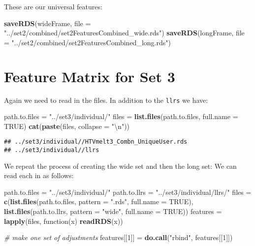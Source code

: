 \documentclass[10pt]{report}
\newenvironment{Shaded}{}{}
\newcommand{\KeywordTok}[1]{\textcolor[rgb]{0.00,0.44,0.13}{\textbf{{#1}}}}
\newcommand{\DataTypeTok}[1]{\textcolor[rgb]{0.56,0.13,0.00}{{#1}}}
\newcommand{\DecValTok}[1]{\textcolor[rgb]{0.25,0.63,0.44}{{#1}}}
\newcommand{\CharTok}[1]{\textcolor[rgb]{0.25,0.44,0.63}{{#1}}}
\newcommand{\StringTok}[1]{\textcolor[rgb]{0.25,0.44,0.63}{{#1}}}
\newcommand{\CommentTok}[1]{\textcolor[rgb]{0.38,0.63,0.69}{\textit{{#1}}}}
\newcommand{\OtherTok}[1]{\textcolor[rgb]{0.00,0.44,0.13}{{#1}}}
\newcommand{\NormalTok}[1]{{#1}}
\begin{document}
These are our universal features:

\begin{Shaded}
\begin{Highlighting}[]
\KeywordTok{saveRDS}\NormalTok{(wideFrame, }\DataTypeTok{file =} \StringTok{"../set2/combined/set2FeaturesCombined_wide.rds"}\NormalTok{)}
\KeywordTok{saveRDS}\NormalTok{(longFrame, }\DataTypeTok{file =} \StringTok{"../set2/combined/set2FeaturesCombined_long.rds"}\NormalTok{)}
\end{Highlighting}
\end{Shaded}

\section{Feature Matrix for Set 3}\label{feature-matrix-for-set-3}

Again we need to read in the files. In addition to the \verb!llrs! we
have:

\begin{Shaded}
\begin{Highlighting}[]
\NormalTok{path.to.files =}\StringTok{ "../set3/individual/"}
\NormalTok{files =}\StringTok{ }\KeywordTok{list.files}\NormalTok{(path.to.files, }\DataTypeTok{full.name =} \OtherTok{TRUE}\NormalTok{)}
\KeywordTok{cat}\NormalTok{(}\KeywordTok{paste}\NormalTok{(files, }\DataTypeTok{collapse =} \StringTok{"}\CharTok{\textbackslash{}n}\StringTok{"}\NormalTok{))}
\end{Highlighting}
\end{Shaded}

\begin{verbatim}
## ../set3/individual//HTVmelt3_Combn_UniqueUser.rds
## ../set3/individual//llrs
\end{verbatim}

We repeat the process of creating the wide set and then the long set: We
can read each in as follows:

\begin{Shaded}
\begin{Highlighting}[]
\NormalTok{path.to.files =}\StringTok{ "../set3/individual/"}
\NormalTok{path.to.llrs =}\StringTok{ "../set3/individual/llrs/"}
\NormalTok{files =}\StringTok{ }\KeywordTok{c}\NormalTok{(}\KeywordTok{list.files}\NormalTok{(path.to.files, }\DataTypeTok{pattern =} \StringTok{".rds"}\NormalTok{, }\DataTypeTok{full.name =} \OtherTok{TRUE}\NormalTok{), }\KeywordTok{list.files}\NormalTok{(path.to.llrs, }
    \DataTypeTok{pattern =} \StringTok{"wide"}\NormalTok{, }\DataTypeTok{full.name =} \OtherTok{TRUE}\NormalTok{))}
\NormalTok{features =}\StringTok{ }\KeywordTok{lapply}\NormalTok{(files, function(x) }\KeywordTok{readRDS}\NormalTok{(x))}

\CommentTok{# make one set of adjustments}
\NormalTok{features[[}\DecValTok{1}\NormalTok{]] =}\StringTok{ }\KeywordTok{do.call}\NormalTok{(}\StringTok{"rbind"}\NormalTok{, features[[}\DecValTok{1}\NormalTok{]])}
\end{Highlighting}
\end{Shaded}
\end{document}
